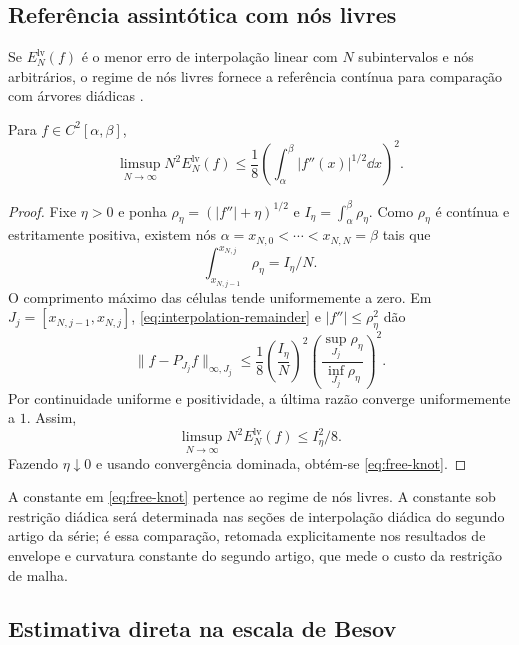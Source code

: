 \subsection{Referência assintótica com nós livres}

Se $E_N^{\mathrm{lv}}(f)$ é o menor erro de interpolação linear com $N$
subintervalos e nós arbitrários, o regime de nós livres fornece a referência
contínua para comparação com árvores diádicas
\citep{deboor1973variable,burchard1974,deboor2001,powell1981,schumaker2007}.

\begin{theorem}\label{thm:free-knots}
Para $f\in C^2[\alpha,\beta]$,
\begin{equation}
 \limsup_{N\to\infty}N^2E_N^{\mathrm{lv}}(f)
 \le\frac18\left(\int_\alpha^\beta |f''(x)|^{1/2}\dd x\right)^2.
 \label{eq:free-knot}
\end{equation}
\end{theorem}

\begin{proof}
Fixe $\eta>0$ e ponha $\rho_\eta=(|f''|+\eta)^{1/2}$ e $I_\eta=\int_\alpha^\beta\rho_\eta$. Como $\rho_\eta$ é contínua e estritamente positiva, existem nós $\alpha=x_{N,0}<\cdots<x_{N,N}=\beta$ tais que
\[
 \int_{x_{N,j-1}}^{x_{N,j}}\rho_\eta=I_\eta/N.
\]
O comprimento máximo das células tende uniformemente a zero. Em $J_j=[x_{N,j-1},x_{N,j}]$, \eqref{eq:interpolation-remainder} e $|f''|\le\rho_\eta^2$ dão
\[
 \|f-P_{J_j}f\|_{\infty,J_j}
 \le\frac18\left(\frac{I_\eta}{N}\right)^2
 \left(\frac{\sup_{J_j}\rho_\eta}{\inf_{J_j}\rho_\eta}\right)^2.
\]
Por continuidade uniforme e positividade, a última razão converge uniformemente a $1$. Assim,
\[
 \limsup_{N\to\infty}N^2E_N^{\mathrm{lv}}(f)\le I_\eta^2/8.
\]
Fazendo $\eta\downarrow0$ e usando convergência dominada, obtém-se \eqref{eq:free-knot}.
\end{proof}

A constante em \eqref{eq:free-knot} pertence ao regime de nós livres. A
constante sob restrição diádica será determinada nas seções de interpolação diádica do segundo artigo da série; é essa comparação, retomada explicitamente nos resultados de envelope e curvatura constante do segundo artigo, que mede o
custo da restrição de malha.

\subsection{Estimativa direta na escala de Besov}

